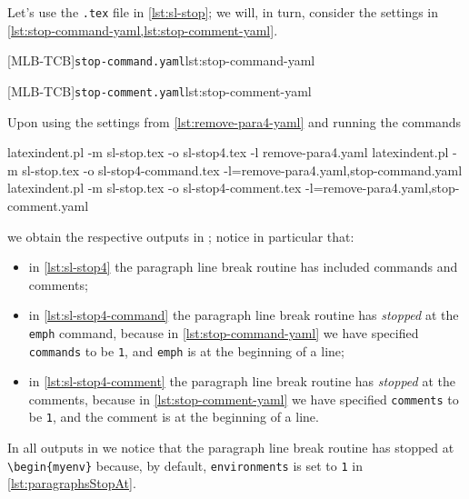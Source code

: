 	Let's use the \texttt{.tex} file in \cref{lst:sl-stop}; we will,
	in turn, consider the settings in \cref{lst:stop-command-yaml,lst:stop-comment-yaml}.

	\begin{minipage}{.45\linewidth}
	\end{minipage}
	\hfill
	\begin{minipage}{.49\linewidth}
		[MLB-TCB]{\texttt{stop-command.yaml}}{lst:stop-command-yaml}

		[MLB-TCB]{\texttt{stop-comment.yaml}}{lst:stop-comment-yaml}
	\end{minipage}

	Upon using the settings from \vref{lst:remove-para4-yaml} and running the commands
	\begin{widepage}
		\begin{commandshell}
latexindent.pl -m sl-stop.tex -o sl-stop4.tex -l remove-para4.yaml
latexindent.pl -m sl-stop.tex -o sl-stop4-command.tex -l=remove-para4.yaml,stop-command.yaml
latexindent.pl -m sl-stop.tex -o sl-stop4-comment.tex -l=remove-para4.yaml,stop-comment.yaml
\end{commandshell}
	\end{widepage}
	we obtain the respective outputs in ; notice in particular
	that:
	\begin{itemize}
		\item in \cref{lst:sl-stop4} the paragraph line break routine has included commands and
		      comments;
		\item in \cref{lst:sl-stop4-command} the paragraph line break routine has
		      \emph{stopped} at the \texttt{emph} command, because in
		      \cref{lst:stop-command-yaml} we have specified \texttt{commands} to be
		      \texttt{1}, and \texttt{emph} is at the beginning of a
		      line;
		\item in \cref{lst:sl-stop4-comment} the paragraph line break routine has
		      \emph{stopped} at the comments, because in \cref{lst:stop-comment-yaml} we
		      have specified \texttt{comments} to be \texttt{1}, and the
		      comment is at the beginning of a line.
	\end{itemize}
	In all outputs in  we notice that the paragraph line break
	routine has stopped at \lstinline!\begin{myenv}! because, by default,
	\texttt{environments} is set to \texttt{1} in
	\vref{lst:paragraphsStopAt}.

